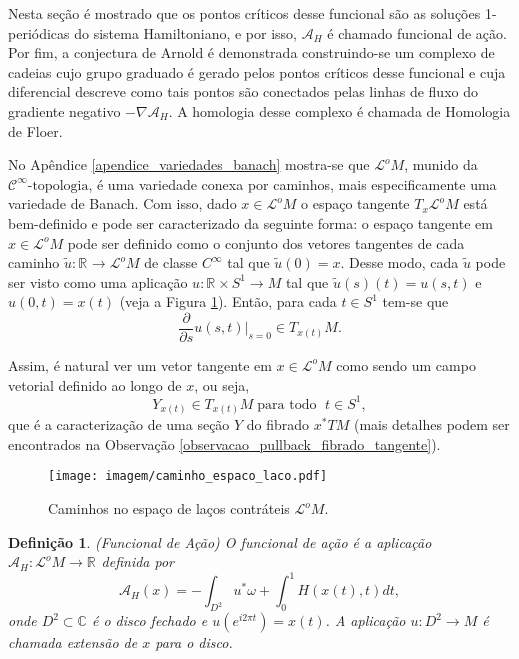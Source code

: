 \documentclass[12pt]{book}
\newtheorem{definicao}[teorema]{Definição}
\newcommand{\circulo}{S^{1}}
\newcommand{\cktopologia}[1]{\mathcal{C}^{#1}\text{-topologia}}
\newcommand{\derivadaparcial}[2]{\frac{\partial #1}{\partial #2}}
\newcommand{\espacotangenteponto}[2]{T_{#1}#2}
\newcommand{\funcionalH}{\mathcal{A}_{H}}
\newcommand{\funcionalHponto}[1]{\mathcal{A}_{H}(#1)}
\newcommand{\gradientefuncional}{\nabla \funcionalH}
\newcommand{\pullbackfibradotangente}[2]{#1^{*}T#2}
\newcommand{\pullbackfibradotangenteM}[1]{\pullbackfibradotangente{#1}{M}}
\newcommand{\retacartesianocirculo}{\real{} \times \circulo}
\newcommand{\real}[1]{\mathbb{R}^{#1}}
\newcommand{\reta}{\real{}}
\newcommand{\lacocontrateis}{\mathcal{L}^{o}M}
\begin{document}
	Nesta seção é mostrado que os pontos críticos desse funcional são as soluções 1-periódicas do sistema Hamiltoniano, e por isso, $\funcionalH$ é chamado funcional de ação. Por fim, a conjectura de Arnold é demonstrada construindo-se um complexo de cadeias cujo grupo graduado é gerado pelos pontos críticos desse funcional e cuja diferencial descreve como tais pontos são conectados pelas linhas de fluxo do gradiente negativo $-\gradientefuncional$. A homologia desse complexo é chamada de Homologia de Floer.
	
	No Apêndice \ref{apendice_variedades_banach} mostra-se que $\lacocontrateis$, munido da $\cktopologia{\infty}$, é uma variedade conexa por caminhos, mais especificamente uma variedade de Banach. Com isso, dado $x\in \lacocontrateis$ o espaço tangente $\espacotangenteponto{x}{\lacocontrateis}$ está bem-definido e pode ser caracterizado da seguinte forma: o espaço tangente em $x \in \lacocontrateis$ pode ser definido como o conjunto dos vetores tangentes de cada caminho $\tilde{u}:\reta\to \lacocontrateis$ de classe $C^{\infty}$ tal que $\tilde{u}(0)=x$. Desse modo, cada $\tilde{u}$ pode ser visto como uma aplicação $u: \retacartesianocirculo \to M$ tal que $\tilde{u}(s)(t) = u(s,t)$ e $u(0,t) = x(t)$ (veja a Figura \ref{figura_caminho_espaco_laco_contrateis}). Então, para cada $t\in \circulo$ tem-se que
	$$
	\derivadaparcial{}{s}u(s,t)|_{s=0} \in \espacotangenteponto{x(t)}{M}.
	$$
	
	Assim, é natural ver um vetor tangente em $x\in \lacocontrateis$ como sendo um campo vetorial definido ao longo de $x$, ou seja, 
	$$
	Y_{x(t)}\in \espacotangenteponto{x(t)}{M} \;\text{para todo  }\; t\in \circulo,
	$$
	que é a caracterização de uma seção $Y$ do fibrado $\pullbackfibradotangenteM{x}$ (mais detalhes podem ser encontrados na Observação \ref{observacao_pullback_fibrado_tangente}). 
	
	\begin{figure}[!h]
		\centering
		\texttt{[image: imagem/caminho\_espaco\_laco.pdf]}
		\caption{Caminhos no espaço de laços contráteis $\lacocontrateis$.}
		\label{figura_caminho_espaco_laco_contrateis}
	\end{figure} 
	
	\begin{definicao}\label{definicao_funcional_hamiltoniano}
		(Funcional de Ação) O funcional de ação é a aplicação $\funcionalH: \lacocontrateis\to \reta$ definida por
		$$
		\funcionalHponto{x} = -\int_{D^{2}}u^{*}\omega + \int_{0}^{1}H(x(t), t)dt,
		$$
		onde $D^{2} \subset \mathbb{C}$ é o disco fechado e $u(e^{i2\pi t})=x(t)$. A aplicação $u:D^{2}\to M$ é chamada extensão de $x$ para o disco.
	\end{definicao}
	
\end{document}
